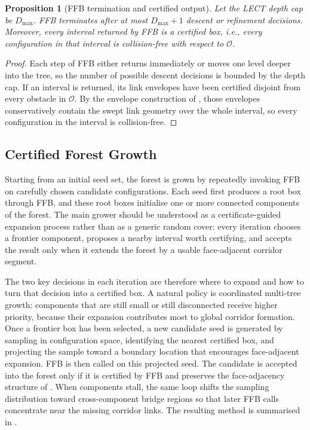 \documentclass[journal]{IEEEtran}
\newtheorem{proposition}{Proposition}
\newcommand{\calO}{\ensuremath{\mathcal{O}}}
\begin{document}
\begin{proposition}[FFB termination and certified output]
\label{prop:ffb_rewrite}
Let the LECT depth cap be $D_{\max}$. FFB terminates after at most
$D_{\max}+1$ descent or refinement decisions. Moreover, every interval returned
by FFB is a certified box, i.e., every configuration in that interval is
collision-free with respect to $\calO$.
\end{proposition}

\begin{proof}
Each step of FFB either returns immediately or moves one level deeper into the
tree, so the number of possible descent decisions is bounded by the depth cap.
If an interval is returned, its link envelopes have been certified disjoint
from every obstacle in $\calO$. By the envelope construction of
, those envelopes conservatively contain the swept
link geometry over the whole interval, so every configuration in the interval
is collision-free.
\end{proof}

\subsection{Certified Forest Growth}\label{sec:forest_growth}

Starting from an initial seed set, the forest is grown by repeatedly invoking
FFB on carefully chosen candidate configurations. Each seed first produces a
root box through FFB, and these root boxes initialise one or more connected
components of the forest. The main grower should be understood as a
certificate-guided expansion process rather than as a generic random cover:
every iteration chooses a frontier component, proposes a nearby interval worth
certifying, and accepts the result only when it extends the forest by a usable
face-adjacent corridor segment.

The two key decisions in each iteration are therefore where to expand and how
to turn that decision into a certified box. A natural policy is coordinated
multi-tree growth: components that are still small or still disconnected
receive higher priority, because their expansion contributes most to global
corridor formation. Once a frontier box has been selected, a new candidate seed
is generated by sampling in configuration space, identifying the nearest
certified box, and projecting the sample toward a boundary location that
encourages face-adjacent expansion. FFB is then called on this projected seed.
The candidate is accepted into the forest only if it is certified by FFB and
preserves the face-adjacency structure of . When
components stall, the same loop shifts the sampling distribution toward
cross-component bridge regions so that later FFB calls concentrate near the
missing corridor links. The resulting method is summarised in
.
\end{document}
